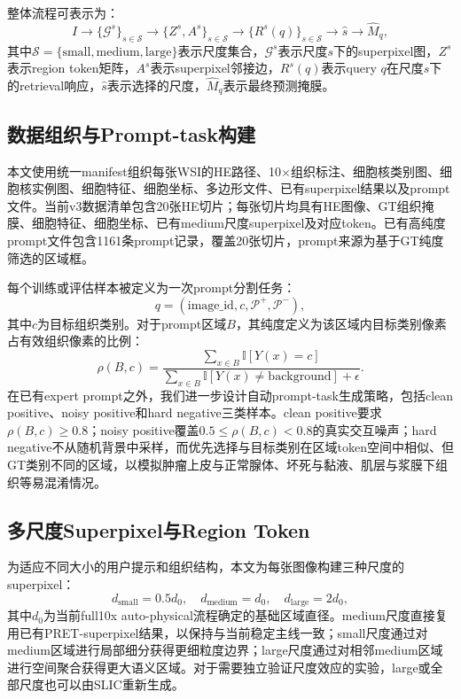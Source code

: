\documentclass[UTF8]{ctexart}
\begin{document}
整体流程可表示为：
\begin{equation}
    I \rightarrow \{\mathcal{G}^{s}\}_{s \in \mathcal{S}}
    \rightarrow \{Z^{s}, A^{s}\}_{s \in \mathcal{S}}
    \rightarrow \{R^{s}(q)\}_{s \in \mathcal{S}}
    \rightarrow \hat{s}
    \rightarrow \hat{M}_{q},
\end{equation}
其中$\mathcal{S}=\{\text{small},\text{medium},\text{large}\}$表示尺度集合，$\mathcal{G}^{s}$表示尺度$s$下的superpixel图，$Z^{s}$表示region token矩阵，$A^{s}$表示superpixel邻接边，$R^{s}(q)$表示query $q$在尺度$s$下的retrieval响应，$\hat{s}$表示选择的尺度，$\hat{M}_{q}$表示最终预测掩膜。

\subsection{数据组织与Prompt-task构建}

本文使用统一manifest组织每张WSI的HE路径、10$\times$组织标注、细胞核类别图、细胞核实例图、细胞特征、细胞坐标、多边形文件、已有superpixel结果以及prompt文件。当前v3数据清单包含20张HE切片；每张切片均具有HE图像、GT组织掩膜、细胞特征、细胞坐标、已有medium尺度superpixel及对应token。已有高纯度prompt文件包含1161条prompt记录，覆盖20张切片，prompt来源为基于GT纯度筛选的区域框。

每个训练或评估样本被定义为一次prompt分割任务：
\begin{equation}
    q=(\text{image\_id}, c, \mathcal{P}^{+}, \mathcal{P}^{-}),
\end{equation}
其中$c$为目标组织类别。对于prompt区域$B$，其纯度定义为该区域内目标类别像素占有效组织像素的比例：
\begin{equation}
    \rho(B,c)=
    \frac{\sum_{x\in B}\mathbb{I}[Y(x)=c]}
    {\sum_{x\in B}\mathbb{I}[Y(x)\neq \text{background}] + \epsilon}.
\end{equation}
在已有expert prompt之外，我们进一步设计自动prompt-task生成策略，包括clean positive、noisy positive和hard negative三类样本。clean positive要求$\rho(B,c)\geq0.8$；noisy positive覆盖$0.5\leq\rho(B,c)<0.8$的真实交互噪声；hard negative不从随机背景中采样，而优先选择与目标类别在区域token空间中相似、但GT类别不同的区域，以模拟肿瘤上皮与正常腺体、坏死与黏液、肌层与浆膜下组织等易混淆情况。

\subsection{多尺度Superpixel与Region Token}

为适应不同大小的用户提示和组织结构，本文为每张图像构建三种尺度的superpixel：
\begin{equation}
    d_{\text{small}}=0.5d_{0}, \quad
    d_{\text{medium}}=d_{0}, \quad
    d_{\text{large}}=2d_{0},
\end{equation}
其中$d_{0}$为当前full10x auto-physical流程确定的基础区域直径。medium尺度直接复用已有PRET-superpixel结果，以保持与当前稳定主线一致；small尺度通过对medium区域进行局部细分获得更细粒度边界；large尺度通过对相邻medium区域进行空间聚合获得更大语义区域。对于需要独立验证尺度效应的实验，large或全部尺度也可以由SLIC重新生成。
\end{document}
